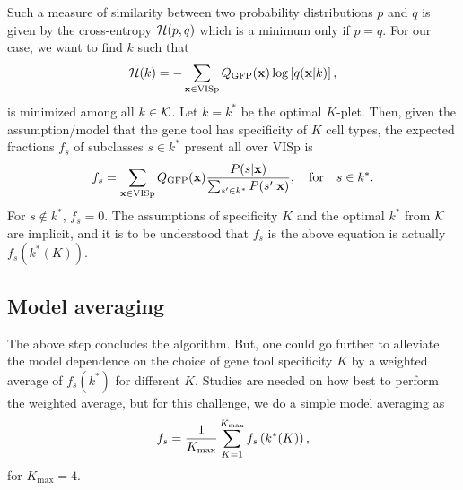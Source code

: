 \documentclass{article}
\newcommand\beq{\begin{equation}}
\newcommand\eeq[1]{\label{#1}\end{equation}}
\begin{document}
Such a measure of similarity between two probability distributions $p$ and $q$ is given by the cross-entropy ${\cal H}(p,q)$ which is a minimum only if $p=q$. For our case, we want to find $k$ such that 
\beq
{\cal H}(k) = - \sum_{\mathbf{x}\in\text{VISp}} Q_{\rm GFP}(\mathbf{x}) \log\left[ q(\mathbf{x}|k)\right],
\eeq{cross}
is minimized among all $k\in {\cal K}$. Let $k=k^*$ be the optimal $K$-plet. Then, given the assumption/model that the gene tool has specificity of $K$ cell types, the expected fractions $f_s$ of subclasses $s\in k^*$ present all over VISp is
\beq
f_s =  \sum_{\mathbf{x}\in\text{VISp}} Q_{\rm GFP}(\mathbf{x}) \frac{P(s|\mathbf{x})}{\sum_{s'\in k^*} P(s'|\mathbf{x}) },\quad\text{for}\quad s\in k^*.
\eeq{frac}
For $s\notin k^*$, $f_s=0$.
The assumptions of specificity $K$ and the optimal $k^*$ from ${\cal K}$ are implicit, and it is to be understood that 
$f_s$ is the above equation is actually $f_s\left(k^*(K)\right)$.

\subsection{Model averaging}
The above step concludes the algorithm. But, one could go further to alleviate the model dependence on the choice of gene tool specificity $K$ by a weighted average of $f_s(k^*)$ for different $K$. Studies are needed on how best to perform the weighted average, but for this challenge, we do a simple model averaging as 
\beq
f_s = \frac{1}{K_{\max}} \sum_{K=1}^{K_{\rm max}} f_s\left(k^*(K)\right),
\eeq{modav}
for $K_{\max}=4$.
\end{document}
